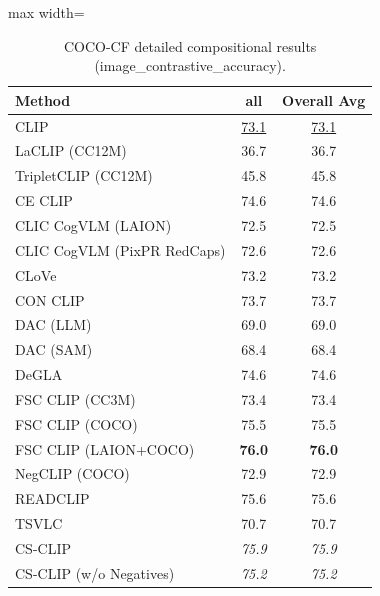 \begin{table}[t]
  \centering
  \scriptsize
  \caption{COCO-CF detailed compositional results (image_contrastive_accuracy).}
  \label{tab:COCO-CF_detailed}
  \begin{adjustbox}{max width=\textwidth}
  \setlength{\tabcolsep}{2pt}
  \begin{tabular}{p{5cm}c|c}
    \toprule
    Method & all & Overall Avg \\
    \midrule
    CLIP & \underline{73.1} & \underline{73.1} \\
    \midrule
    LaCLIP (CC12M) & 36.7 & 36.7 \\
    TripletCLIP (CC12M) & 45.8 & 45.8 \\
    \midrule
    CE CLIP & 74.6 & 74.6 \\
    CLIC CogVLM (LAION) & 72.5 & 72.5 \\
    CLIC CogVLM (PixPR RedCaps) & 72.6 & 72.6 \\
    CLoVe & 73.2 & 73.2 \\
    CON CLIP & 73.7 & 73.7 \\
    DAC (LLM) & 69.0 & 69.0 \\
    DAC (SAM) & 68.4 & 68.4 \\
    DeGLA & 74.6 & 74.6 \\
    FSC CLIP (CC3M) & 73.4 & 73.4 \\
    FSC CLIP (COCO) & 75.5 & 75.5 \\
    FSC CLIP (LAION+COCO) & \textbf{76.0} & \textbf{76.0} \\
    NegCLIP (COCO) & 72.9 & 72.9 \\
    READCLIP & 75.6 & 75.6 \\
    TSVLC & 70.7 & 70.7 \\
    \midrule
    CS-CLIP & \emph{75.9} & \emph{75.9} \\
    CS-CLIP (w/o Negatives) & \emph{75.2} & \emph{75.2} \\
    \bottomrule
  \end{tabular}
  \end{adjustbox}
\end{table}

